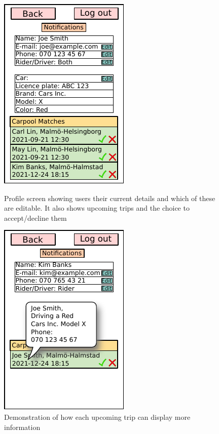 \documentclass{article}
\begin{document}
\begin{figure}[!htpb]
    \centering
    \begin{minipage}{0.25\textwidth}
        \centering
        \includegraphics[scale=1]{profile.pdf}
        \caption{Profile screen showing users their current details and which of these are editable. It also shows upcoming trips and the choice to accept/decline them}
        \label{fig:profile}
    \end{minipage}\hfill
    \begin{minipage}{0.25\textwidth}
        \centering
        \includegraphics[scale=1]{profile2.pdf}
        \caption{Demonstration of how each upcoming trip can display more information}
        \label{fig:profile2}
    \end{minipage}\hfill
    \begin{minipage}{0.25\textwidth}

\end{minipage}
\end{figure}
\end{document}
